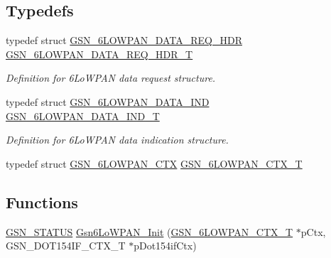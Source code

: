 \subsection*{Typedefs}
\begin{DoxyCompactItemize}
\item 
typedef struct \hyperlink{a00021}{GSN\_\-6LOWPAN\_\-DATA\_\-REQ\_\-HDR} \hyperlink{a00472_a4442a22bbd09901ab9c7832e7c2b1afa}{GSN\_\-6LOWPAN\_\-DATA\_\-REQ\_\-HDR\_\-T}
\begin{DoxyCompactList}\small\item\em Definition for 6LoWPAN data request structure. \end{DoxyCompactList}\item 
typedef struct \hyperlink{a00020}{GSN\_\-6LOWPAN\_\-DATA\_\-IND} \hyperlink{a00472_a0bdc410ca569b13e8f9cd9c65421d1fb}{GSN\_\-6LOWPAN\_\-DATA\_\-IND\_\-T}
\begin{DoxyCompactList}\small\item\em Definition for 6LoWPAN data indication structure. \end{DoxyCompactList}\item 
typedef struct \hyperlink{a00019}{GSN\_\-6LOWPAN\_\-CTX} \hyperlink{a00472_a98fd6582f60bc04e61617c15aec72483}{GSN\_\-6LOWPAN\_\-CTX\_\-T}
\end{DoxyCompactItemize}
\subsection*{Functions}
\begin{DoxyCompactItemize}
\item 
\hyperlink{a00660_gada5951904ac6110b1fa95e51a9ddc217}{GSN\_\-STATUS} \hyperlink{a00472_ace3281f40dc2aff22e6466a5a358d461}{Gsn6LoWPAN\_\-Init} (\hyperlink{a00019}{GSN\_\-6LOWPAN\_\-CTX\_\-T} $\ast$pCtx, GSN\_\-DOT154IF\_\-CTX\_\-T $\ast$pDot154ifCtx)
\end{DoxyCompactItemize}


